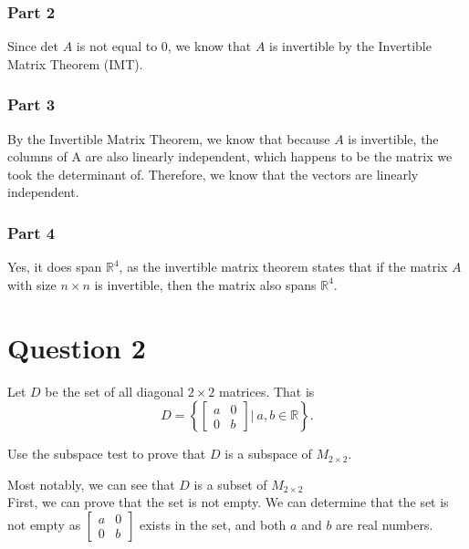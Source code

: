 \documentclass{report}
\begin{document}
\subsubsection*{Part 2}
Since det $A$ is not equal to 0, we know that $A$ is invertible by the Invertible Matrix Theorem (IMT).

\subsubsection*{Part 3}
By the Invertible Matrix Theorem, we know that because $A$ is invertible, the columns of A are also linearly independent, which happens to be the matrix we took the determinant of. Therefore, we know that the vectors are linearly independent.

\subsubsection*{Part 4}
Yes, it does span $\mathbb{R}^4$, as the invertible matrix theorem states that if the matrix $A$ with size $n\times n$ is invertible, then the matrix also spans $\mathbb{R}^4$.
\clearpage

\section*{Question 2}
\begin{example}
    Let $D$ be the set of all diagonal $2 \times 2$ matrices. That is
    $$D = \left\{ \begin{bmatrix} a & 0 \\ 0 & b \end{bmatrix} \bigg|\ a, b \in \mathbb{R} \right\}.$$
    
    Use the subspace test to prove that $D$ is a subspace of $M_{2 \times 2}$.
\end{example}
Most notably, we can see that $D$ is a subset of $M_{2\times2}$\\

First, we can prove that the set is not empty. We can determine that the set is not empty as $\begin{bmatrix} a & 0 \\ 0 & b \end{bmatrix}$ exists in the set, and both $a$ and $b$ are real numbers.\\
\end{document}
